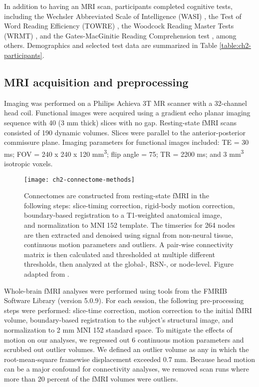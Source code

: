 In addition to having an MRI scan, participants completed cognitive tests, including the Wechsler Abbreviated Scale of Intelligence (WASI) \citep{Kaplan1999}, the Test of Word Reading Efficiency (TOWRE) \citep{Torgesen2012}, the Woodcock Reading Master Tests (WRMT) \citep{Woodcock1998}, and the Gates-MacGinitie Reading Comprehension test \citep{MacGinitie2000}, among others. Demographics and selected test data are summarized in Table \ref{table:ch2-participants}.

\subsection{MRI acquisition and preprocessing}

Imaging was performed on a Philips Achieva 3T MR scanner with a 32-channel head coil. Functional images were acquired using a gradient echo planar imaging sequence with 40 (3 mm thick) slices with no gap. Resting-state fMRI scans consisted of 190 dynamic volumes. Slices were parallel to the anterior-posterior commissure plane. Imaging parameters for functional images included: TE = 30 ms; FOV = 240 x 240 x 120 mm\textsuperscript{3}; flip angle = 75\degree; TR = 2200 ms; and 3 mm\textsuperscript{3} isotropic voxels.

\begin{figure}[t]
    \centering
    \texttt{[image: ch2-connectome-methods]}
    \caption[Schematic for connectome construction]{Connectomes are constructed from resting-state fMRI in the following steps: slice-timing correction, rigid-body motion correction, boundary-based registration to a T1-weighted anatomical image, and normalization to MNI 152 template. The timseries for 264 nodes are then extracted and denoised using signal from non-neural tissue, continuous motion parameters and outliers. A pair-wise connectivity matrix is then calculated and thresholded at multiple different thresholds, then analyzed at the global-, RSN-, or node-level. Figure adapted from \citep{Yang2018}.}
    \label{fig:ch2-connectome-methods}
\end{figure}

Whole-brain fMRI analyses were performed using tools from the FMRIB Software Library (version 5.0.9). For each session, the following pre-processing steps were performed:  slice-time correction, motion correction to the initial fMRI volume, boundary-based registration to the subject's structural image, and normalization to 2 mm MNI 152 standard space. To mitigate the effects of motion on our analyses, we regressed out 6 continuous motion parameters and scrubbed out outlier volumes. We defined an outlier volume as any in which the root-mean-square framewise displacement exceeded 0.7 mm. Because head motion can be a major confound for connectivity analyses, we removed scan runs where more than 20 percent of the fMRI volumes were outliers.

